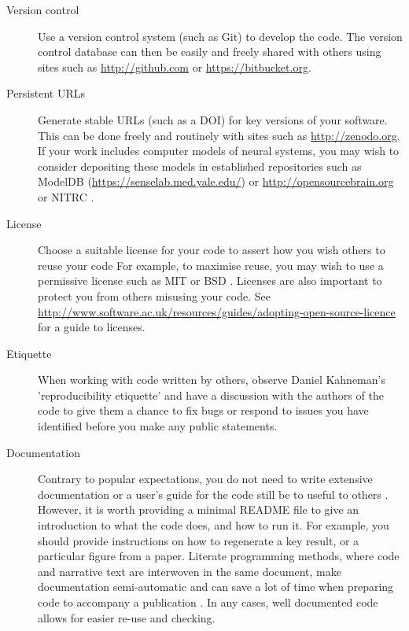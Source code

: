 \documentclass[11pt]{article}
\begin{document}
\begin{description}
\item [Version control] Use a version control system (such as Git) to
  develop the code.  The version control database can then be easily and freely
  shared with others using sites such as \url{http://github.com} \cite{Ram2013} or \url{https://bitbucket.org}.

\item [Persistent URLs] Generate stable URLs (such as a DOI) for key
  versions of your software.  This can be done freely and routinely with sites
  such as \url{http://zenodo.org}.  If your work includes computer
  models of neural systems, you may wish to consider depositing these
  models in established repositories such as ModelDB
  (\url{https://senselab.med.yale.edu/}) or
  \url{http://opensourcebrain.org} or NITRC \cite{poline_software_2014}.

\item [License] Choose a suitable license for your code to assert how you wish others to reuse your code  For example, to maximise reuse, you may wish to use a permissive license such as MIT or BSD \cite{Stodden2009}.  Licenses are also important to protect you from others misusing your code. See  \url{http://www.software.ac.uk/resources/guides/adopting-open-source-licence}  for a guide to licenses.

\item [Etiquette] When working with code written by others, observe Daniel Kahneman's  'reproducibility etiquette'\cite{Kahneman2014} and have a discussion with the authors of the code to give them a chance to fix bugs or respond to issues you have identified before you make any public statements. 

\item [Documentation] Contrary to popular expectations, you do not
  need to write extensive documentation or a user's guide for the code
  still be to useful to others \cite{Barnes2010-iv}.  However, it is
  worth providing a minimal README file to give an introduction to
  what the code does, and how to run it.  For example, you should provide
  instructions on how to regenerate a key result, or a particular
  figure from a paper. Literate programming methods, where code and narrative text are interwoven in the same document, make documentation semi-automatic and can save a lot of time when preparing code to accompany a publication \cite{schulte2012multi, gentleman2012statistical}. In any cases, well documented code allows for easier re-use and checking.


\end{description}
\end{document}
